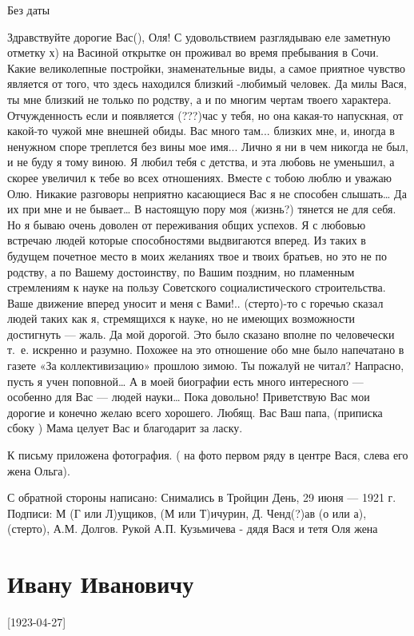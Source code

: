 \documentclass[]{memoir}
\begin{document}
Без даты

Здравствуйте дорогие Вас(), Оля!
С удовольствием разглядываю еле заметную отметку х) на  Васиной открытке он проживал во время пребывания в Сочи. Какие великолепные постройки, знаменательные виды, а самое приятное чувство является от того, что здесь находился близкий -любимый человек. Да милы Вася, ты мне близкий не только по родству, а и по многим чертам твоего характера. Отчужденность если и появляется (???)час у тебя, но она какая-то напускная, от какой-то чужой  мне внешней обиды. Вас много там... близких мне, и, иногда в ненужном споре треплется без вины мое имя... Лично я ни в чем никогда не был, и не буду я тому виною. Я любил тебя с детства, и эта любовь не уменьшил, а скорее увеличил к тебе во всех отношениях. Вместе с тобою люблю и уважаю Олю. Никакие разговоры неприятно касающиеся Вас я не способен слышать… Да их при мне и не бывает…
В настоящую пору моя (жизнь?) тянется не для себя. Но я бываю очень доволен от переживания общих успехов. Я с любовью встречаю людей которые способностями выдвигаются вперед. Из таких в будущем почетное место в моих желаниях твое и твоих братьев, но это не по родству, а по Вашему достоинству, по Вашим поздним, но пламенным стремлениям к науке на пользу Советского социалистического строительства. 
Ваше движение вперед уносит и меня с Вами!..
(стерто)-то с горечью сказал людей таких как я, стремящихся к науке, но не имеющих возможности достигнуть — жаль. Да мой дорогой. Это было сказано вполне по человечески т. е. искренно и разумно. Похожее на это отношение обо мне было напечатано в газете «За коллективизацию» прошлою зимою. Ты пожалуй не читал? Напрасно, пусть я учен поповной… А в моей биографии есть много интересного — особенно для Вас — людей науки… Пока довольно! Приветствую Вас мои дорогие и конечно желаю всего хорошего.
Любящ. Вас Ваш папа,
(приписка сбоку ) Мама целует Вас и благодарит за ласку.

К письму приложена фотография. ( на фото первом ряду в центре Вася, слева его жена Ольга).  

С обратной стороны написано:
Снимались в Тройцин День, 29 июня — 1921 г.
Подписи: М (Г или Л)ущиков, (М или Т)ичурин, Д. Ченд(?)ав (о или а),  (стерто), А.М. Долгов. 
Рукой А.П. Кузьмичева -  дядя Вася и тетя Оля жена 


\section{Ивану Ивановичу}

[1923-04-27]
\end{document}
